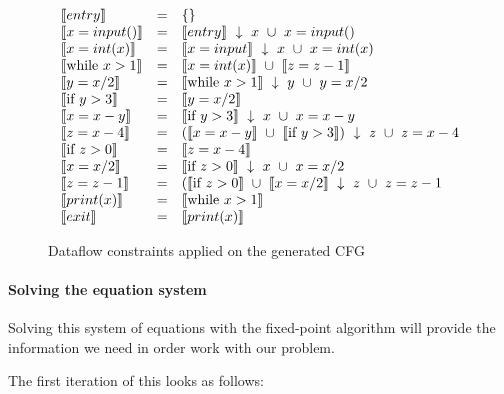 \begin{figure}[H]
\[
\begin{array}{lcl}
  \llbracket entry \rrbracket & = & \{\}\\
  \llbracket x = input() \rrbracket & = & \llbracket entry \rrbracket ~ \downarrow ~ x ~ \cup ~ x = input()\\
  \llbracket x = int(x) \rrbracket & = & \llbracket x = input \rrbracket ~ \downarrow ~ x ~ \cup ~ x = int(x)\\
  \llbracket \text{while } x > 1 \rrbracket & = & \llbracket x = int(x) \rrbracket ~ \cup ~ \llbracket z = z - 1 \rrbracket\\
  \llbracket  y = x / 2 \rrbracket & = & \llbracket \text{while } x > 1 \rrbracket ~ \downarrow ~ y ~ \cup ~ y = x / 2\\
  \llbracket \text{if } y > 3 \rrbracket & = & \llbracket  y = x / 2 \rrbracket\\
  \llbracket  x = x-y \rrbracket & = & \llbracket \text{if } y > 3 \rrbracket ~ \downarrow ~ x ~ \cup ~ x = x-y\\
  \llbracket  z = x-4 \rrbracket & = & (\llbracket x = x-y \rrbracket ~ \cup ~ \llbracket \text{if } y > 3 \rrbracket) ~ \downarrow ~ z ~ \cup ~ z = x-4\\
  \llbracket \text{if } z > 0 \rrbracket & = & \llbracket z = x - 4 \rrbracket\\
  \llbracket x = x / 2 \rrbracket & = & \llbracket \text{if } z > 0 \rrbracket ~ \downarrow ~ x ~ \cup ~ x = x/2\\
  \llbracket z = z - 1 \rrbracket & = & (\llbracket \text{if } z > 0 \rrbracket ~ \cup ~ \llbracket x = x / 2 \rrbracket ~ \downarrow ~ z ~ \cup ~ z = z - 1\\
  \llbracket print(x) \rrbracket & = & \llbracket \text{while } x > 1 \rrbracket\\
  \llbracket exit \rrbracket & = & \llbracket print(x) \rrbracket
\end{array}
\]
\caption{Dataflow constraints applied on the generated CFG}
\end{figure}

\paragraph{Solving the equation system}
Solving this system of equations with the fixed-point algorithm will provide the information we need in order work with our problem.

The first iteration of this looks as follows:

